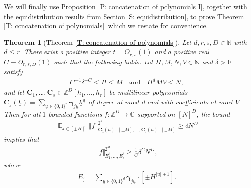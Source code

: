 \documentclass[11pt]{amsart}
\newtheorem*{theorem*}{Theorem}
\theoremstyle{definition}
\DeclareMathOperator*{\E}{\mathbb{E}}
\newcommand{\C}{{\mathbb C}}
\newcommand{\N}{{\mathbb N}}
\newcommand{\Z}{{\mathbb Z}}
\newcommand{\bc}{{\mathbf{C}}}
\newcommand{\bgamma}{{\boldsymbol{\gamma}}}
\newcommand{\uh}{{\underline{h}}}
\newcommand{\uu}{{\underline{u}}}
\newcommand{\norm}[1]{\left\Vert #1\right\Vert}
\begin{document}
We will finally use Proposition \ref{P: concatenation of polynomials I}, together with the equidistribution results from Section \ref{S: equidistribution}, to prove Theorem \ref{T: concatenation of polynomials}, which we restate for convenience.

\begin{theorem*}[Theorem \ref{T: concatenation of polynomials}]
Let $d, r,s,D \in \N$ with $d\leq r$.  There exist a positive integer $t=O_{r, s}(1)$ and a positive real $C=O_{r,s,D}(1)$ such that the following holds.  Let $H, M, N, V\in\N$ and $\delta>0$ satisfy
    \begin{align*}
        C^{-1}\delta^{-C}\leq H\leq M\quad \textrm{and}\quad H^d M V\leq N,
    \end{align*}
    and let $\bc_1, \ldots, \bc_s\in\Z^D[h_1, \ldots, h_r]$ be multilinear polynomials $\bc_j(\uh) = \sum\limits_{\uu\in\{0,1\}^r} \bgamma_{j\uu}\uh^\uu$ of degree at most $d$ and with coefficients at most $V$.  Then for all $1$-bounded functions $f:\Z^D\to\C$ supported on $[N]^D$, the bound
    \begin{align*}
        \E_{\uh\in[\pm H]^r}\norm{f}_{\bc_1(\uh)\cdot[\pm M], \ldots, \bc_s(\uh)\cdot[\pm M]}^{2^s}\geq \delta N^D
    \end{align*}
        implies that
    \begin{align*}
        \norm{f}_{E_1^{ t}, \ldots, E_s^{ t}}^{2^{st}}\geq \frac{1}{C}\delta^{C}N^{D},
    \end{align*}
    where
    \begin{align*}
        E_j = \sum_{\uu\in\{0,1\}^d}\bgamma_{j\uu}\cdot [\pm H^{|\uu|+1}].
    \end{align*} 
\end{theorem*}
\end{document}
